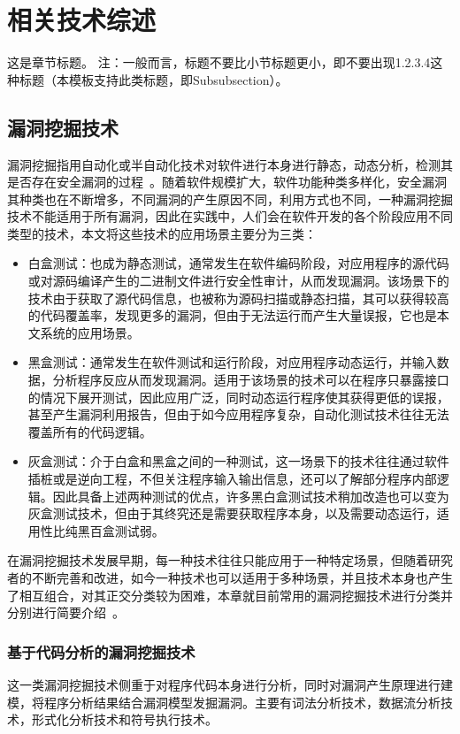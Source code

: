\chapter{相关技术综述}
这是章节标题。
注：一般而言，标题不要比小节标题更小，即不要出现1.2.3.4这种标题（本模板支持此类标题，即Subsubsection）。

\section{漏洞挖掘技术}
漏洞挖掘指用自动化或半自动化技术对软件进行本身进行静态，动态分析，检测其是否存在安全漏洞的过程~\cite{liujian2018}。随着软件规模扩大，软件功能种类多样化，安全漏洞其种类也在不断增多，不同漏洞的产生原因不同，利用方式也不同，一种漏洞挖掘技术不能适用于所有漏洞，因此在实践中，人们会在软件开发的各个阶段应用不同类型的技术，本文将这些技术的应用场景主要分为三类：
\begin{itemize}
    \item  白盒测试：也成为静态测试，通常发生在软件编码阶段，对应用程序的源代码或对源码编译产生的二进制文件进行安全性审计，从而发现漏洞。该场景下的技术由于获取了源代码信息，也被称为源码扫描或静态扫描，其可以获得较高的代码覆盖率，发现更多的漏洞，但由于无法运行而产生大量误报，它也是本文系统的应用场景。
    \item 黑盒测试：通常发生在软件测试和运行阶段，对应用程序动态运行，并输入数据，分析程序反应从而发现漏洞。适用于该场景的技术可以在程序只暴露接口的情况下展开测试，因此应用广泛，同时动态运行程序使其获得更低的误报，甚至产生漏洞利用报告，但由于如今应用程序复杂，自动化测试技术往往无法覆盖所有的代码逻辑。
    \item 灰盒测试：介于白盒和黑盒之间的一种测试，这一场景下的技术往往通过软件插桩或是逆向工程，不但关注程序输入输出信息，还可以了解部分程序内部逻辑。因此具备上述两种测试的优点，许多黑白盒测试技术稍加改造也可以变为灰盒测试技术，但由于其终究还是需要获取程序本身，以及需要动态运行，适用性比纯黑百盒测试弱。
\end{itemize}

在漏洞挖掘技术发展早期，每一种技术往往只能应用于一种特定场景，但随着研究者的不断完善和改进，如今一种技术也可以适用于多种场景，并且技术本身也产生了相互组合，对其正交分类较为困难，本章就目前常用的漏洞挖掘技术进行分类并分别进行简要介绍~\cite{liujian2018,meihong2009}。


\subsection{基于代码分析的漏洞挖掘技术}
这一类漏洞挖掘技术侧重于对程序代码本身进行分析，同时对漏洞产生原理进行建模，将程序分析结果结合漏洞模型发掘漏洞。主要有词法分析技术，数据流分析技术，形式化分析技术和符号执行技术。\\
